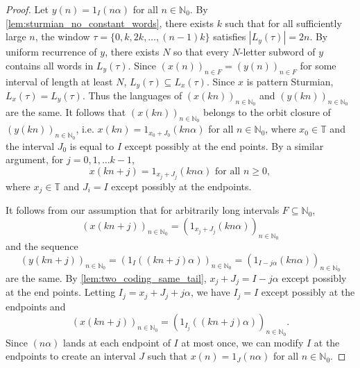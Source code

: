 \documentclass[11pt,reqno]{amsart}
\theoremstyle{definition}
\theoremstyle{plain}
\newcommand{\Z}{\mathbb{Z}}
\newcommand{\N}{\mathbb{N}}
\newcommand{\T}{\mathbb{T}}
\newcommand{\AuthornoteR}[2]{{\sf\small\color{blue}{[#1: #2]}}}
\newcommand{\AuthornoteC}[2]{{\sf\small\color{cyan}{[#1: #2]}}}
\newcommand{\rp}{\AuthornoteR{R}}
\newcommand{\Cnote}{\AuthornoteC{C}}
\begin{document}
\begin{proof}
Let $y(n) = 1_I(n \alpha)$ for all $n \in \N_0$.
By \cref{lem:sturmian_no_constant_words}, there exists $k$ such that for all sufficiently large $n$, the window $\tau = \{0, k, 2k, \ldots, (n-1)k\}$ satisfies $|L_y(\tau)| = 2n$. By uniform recurrence of $y$, there exists $N$ so that every $N$-letter subword of $y$ contains all words in $L_y(\tau)$. Since $(x(n))_{n \in F} = (y(n))_{n \in F}$ for some interval of length at least $N$, $L_y(\tau) \subseteq L_x(\tau)$. Since $x$ is pattern Sturmian, $L_x(\tau) = L_y(\tau)$.  %
Thus the languages of $(x(kn))_{n \in \N_0}$ and $(y(kn))_{n \in \N_0}$ are the same. It follows that $(x(kn))_{n \in \N_0}$ belongs to the orbit closure of $(y(kn))_{n \in \N_0}$, i.e. $x(kn) = 1_{x_0 + J_0}(kn\alpha)$ for all $n \in \N_0$, where $x _0 \in \T$ and the interval $J_0$ is equal to $I$ except possibly at the end points. By a similar argument, for $j = 0, 1, \ldots k - 1$, 
\[
    x(kn + j) = 1_{x_j + J_j}(kn \alpha) \text{ for all } n \geq 0,
\]
where $x_j \in \T$ and $J_i = I$ except possibly at the endpoints. 

It follows from our assumption that for arbitrarily long intervals $F \subseteq \N_0$,
\[
    (x(kn + j))_{n \in \N_0} = (1_{x_j + J_j}(kn \alpha))_{n \in \N_0}
\]
and the sequence
\[
    (y(kn + j))_{n \in \N_0} = (1_I((kn + j)\alpha))_{n \in \N_0} = (1_{I- j \alpha}(kn \alpha))_{n \in \N_0}
\]
are the same. By \cref{lem:two_coding_same_tail}, $x_j + J_j = I - j \alpha$ except possibly at the end points. Letting $I_j = x_j + J_j + j \alpha$, we have $I_j = I$ except possibly at the endpoints and
\[
    (x(kn + j))_{n \in \N_0} = (1_{I_j}((kn + j)\alpha))_{n \in \N_0}.
\]
Since $(n \alpha)$ lands at each endpoint of $I$ at most once, we can modify $I$ at the endpoints to create an interval $J$ such that $x(n) = 1_J(n \alpha)$ for all $n \in \N_0$.
\end{proof}
\end{document}
